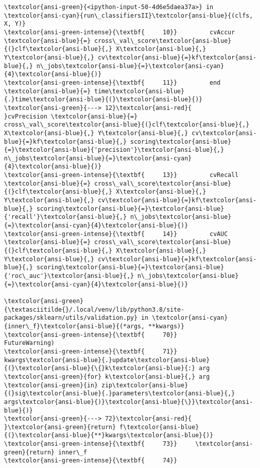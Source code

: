 \documentclass[11pt]{article}
\begin{document}
\begin{Verbatim}[commandchars=\\\{\}, frame=single, framerule=2mm, rulecolor=\color{outerrorbackground}]
\textcolor{ansi-green}{<ipython-input-50-4d6e5daea37a>} in \textcolor{ansi-cyan}{run\_classifiersII}\textcolor{ansi-blue}{(clfs, X, Y)}
\textcolor{ansi-green-intense}{\textbf{     10}}         cvAccur \textcolor{ansi-blue}{=} cross\_val\_score\textcolor{ansi-blue}{(}clf\textcolor{ansi-blue}{,} X\textcolor{ansi-blue}{,} Y\textcolor{ansi-blue}{,} cv\textcolor{ansi-blue}{=}kf\textcolor{ansi-blue}{,} n\_jobs\textcolor{ansi-blue}{=}\textcolor{ansi-cyan}{4}\textcolor{ansi-blue}{)}
\textcolor{ansi-green-intense}{\textbf{     11}}         end \textcolor{ansi-blue}{=} time\textcolor{ansi-blue}{.}time\textcolor{ansi-blue}{(}\textcolor{ansi-blue}{)}
\textcolor{ansi-green}{---> 12}\textcolor{ansi-red}{         }cvPrecision \textcolor{ansi-blue}{=} cross\_val\_score\textcolor{ansi-blue}{(}clf\textcolor{ansi-blue}{,} X\textcolor{ansi-blue}{,} Y\textcolor{ansi-blue}{,} cv\textcolor{ansi-blue}{=}kf\textcolor{ansi-blue}{,} scoring\textcolor{ansi-blue}{=}\textcolor{ansi-blue}{'precision'}\textcolor{ansi-blue}{,} n\_jobs\textcolor{ansi-blue}{=}\textcolor{ansi-cyan}{4}\textcolor{ansi-blue}{)}
\textcolor{ansi-green-intense}{\textbf{     13}}         cvRecall \textcolor{ansi-blue}{=} cross\_val\_score\textcolor{ansi-blue}{(}clf\textcolor{ansi-blue}{,} X\textcolor{ansi-blue}{,} Y\textcolor{ansi-blue}{,} cv\textcolor{ansi-blue}{=}kf\textcolor{ansi-blue}{,} scoring\textcolor{ansi-blue}{=}\textcolor{ansi-blue}{'recall'}\textcolor{ansi-blue}{,} n\_jobs\textcolor{ansi-blue}{=}\textcolor{ansi-cyan}{4}\textcolor{ansi-blue}{)}
\textcolor{ansi-green-intense}{\textbf{     14}}         cvAUC \textcolor{ansi-blue}{=} cross\_val\_score\textcolor{ansi-blue}{(}clf\textcolor{ansi-blue}{,} X\textcolor{ansi-blue}{,} Y\textcolor{ansi-blue}{,} cv\textcolor{ansi-blue}{=}kf\textcolor{ansi-blue}{,} scoring\textcolor{ansi-blue}{=}\textcolor{ansi-blue}{'roc\_auc'}\textcolor{ansi-blue}{,} n\_jobs\textcolor{ansi-blue}{=}\textcolor{ansi-cyan}{4}\textcolor{ansi-blue}{)}

\textcolor{ansi-green}{\textasciitilde{}/.local/venv/lib/python3.8/site-packages/sklearn/utils/validation.py} in \textcolor{ansi-cyan}{inner\_f}\textcolor{ansi-blue}{(*args, **kwargs)}
\textcolor{ansi-green-intense}{\textbf{     70}}                           FutureWarning)
\textcolor{ansi-green-intense}{\textbf{     71}}         kwargs\textcolor{ansi-blue}{.}update\textcolor{ansi-blue}{(}\textcolor{ansi-blue}{\{}k\textcolor{ansi-blue}{:} arg \textcolor{ansi-green}{for} k\textcolor{ansi-blue}{,} arg \textcolor{ansi-green}{in} zip\textcolor{ansi-blue}{(}sig\textcolor{ansi-blue}{.}parameters\textcolor{ansi-blue}{,} args\textcolor{ansi-blue}{)}\textcolor{ansi-blue}{\}}\textcolor{ansi-blue}{)}
\textcolor{ansi-green}{---> 72}\textcolor{ansi-red}{         }\textcolor{ansi-green}{return} f\textcolor{ansi-blue}{(}\textcolor{ansi-blue}{**}kwargs\textcolor{ansi-blue}{)}
\textcolor{ansi-green-intense}{\textbf{     73}}     \textcolor{ansi-green}{return} inner\_f
\textcolor{ansi-green-intense}{\textbf{     74}} 


\end{Verbatim}
\end{document}
